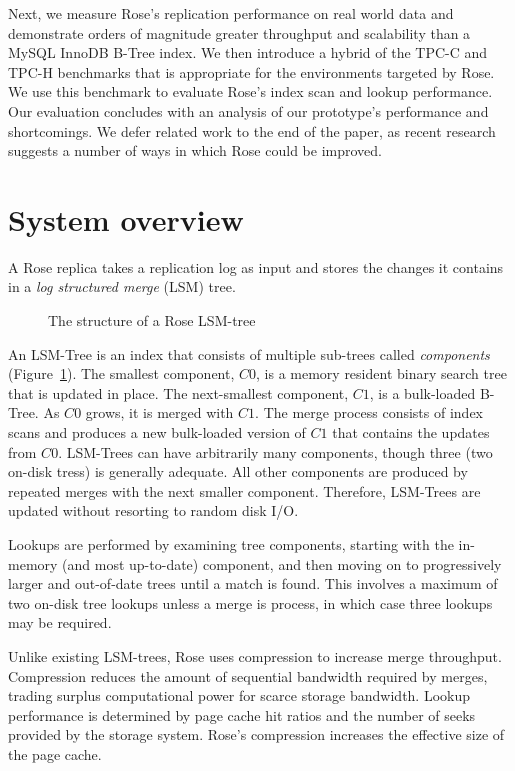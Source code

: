 \documentclass{vldb}
\newcommand{\rows}{Rose\xspace}
\newcommand{\rowss}{Rose's\xspace}
\begin{document}
Next, we
measure \rowss replication performance on real world data and
demonstrate orders of magnitude greater throughput and scalability than
a MySQL InnoDB B-Tree index.  We then introduce a hybrid of the
TPC-C and TPC-H benchmarks that is appropriate for the environments
targeted by \rows.  We use this benchmark to evaluate \rowss index scan and lookup performance.  Our evaluation concludes
with an analysis of our prototype's performance and shortcomings.  We
defer related work to the end of the paper, as recent research
suggests a number of ways in which \rows could be improved.

\section{System overview}

A \rows replica takes a replication log as input and stores the
changes it contains in a {\em log structured merge} (LSM)
tree\cite{lsm}.
\begin{figure}
\centering {}
\caption{The structure of a \rows LSM-tree}
\label{fig:lsm-tree}
\end{figure}
An LSM-Tree is an index that consists of multiple sub-trees called
{\em components} (Figure~\ref{fig:lsm-tree}).  The smallest component, $C0$, is a memory resident
binary search tree that is updated in place.  The next-smallest component, $C1$, is a bulk-loaded B-Tree.  As $C0$ grows,
it is merged with $C1$.  The merge process consists of index scans
and produces a new bulk-loaded version of $C1$ that contains the
updates from $C0$.  LSM-Trees can have arbitrarily many components,
though three (two on-disk tress) is generally adequate.
All other
components are produced by repeated merges with the next smaller
component.  Therefore, LSM-Trees are updated without resorting to
random disk I/O.

Lookups are performed by examining tree components, starting with the
in-memory (and most up-to-date) component, and then moving on
to progressively larger and out-of-date trees until a match is found.
This involves a maximum of two on-disk tree lookups unless a merge is
process, in which case three lookups may be required.

Unlike existing LSM-trees, \rows uses compression to increase merge
throughput.  Compression reduces the amount of sequential bandwidth
required by merges, trading surplus
computational power for scarce storage bandwidth.  Lookup performance
is determined by page cache hit ratios and the number of seeks
provided by the storage system.  \rowss compression increases the
effective size of the page cache.
\end{document}
